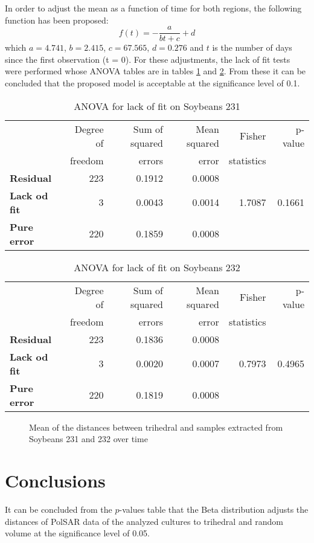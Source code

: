 \documentclass[12pt]{article}
\begin{document}
In order to adjust the mean as a function of time for both regions, the following function has been proposed:
\begin{equation}
f(t) = -\frac{a}{bt + c} + d
\end{equation}
which $a = 4.741$, $b = 2.415$, $c = 67.565$, $d = 0.276$ and $t$ is the number of days since the first observation (t = 0). For these adjustments, the lack of fit tests were performed whose ANOVA tables are in tables \ref{tab:anova_sb231} and \ref{tab:anova_sb232}. From these it can be concluded that the proposed model is acceptable at the significance level of 0.1.

\begin{table}[hbt]
  \centering
  \caption{ANOVA for lack of fit on Soybeans 231}
  \label{tab:anova_sb231}
  \begin{tabular}{lrrrrr}
    \toprule
    & Degree of & Sum of squared & Mean squared & Fisher & p-value\\
    & freedom & errors & error & statistics &\\
    \cmidrule(lr){2-6}
    \textbf{Residual} & 223 & 0.1912 & 0.0008 & &\\
    \textbf{Lack od fit} & 3 & 0.0043 & 0.0014 & 1.7087 & 0.1661\\
    \textbf{Pure error} & 220 & 0.1859 & 0.0008 & &\\
    \bottomrule
  \end{tabular}
\end{table}

\begin{table}[hbt]
  \centering
  \caption{ANOVA for lack of fit on Soybeans 232}
  \label{tab:anova_sb232}
  \begin{tabular}{lrrrrr}
    \toprule
    & Degree of & Sum of squared & Mean squared & Fisher & p-value\\
    & freedom & errors & error & statistics &\\
    \cmidrule(lr){2-6}
    \textbf{Residual} & 223 & 0.1836 & 0.0008 & &\\
    \textbf{Lack od fit} & 3 & 0.0020 & 0.0007 & 0.7973 & 0.4965\\
    \textbf{Pure error} & 220 & 0.1819 & 0.0008 & &\\
    \bottomrule
  \end{tabular}
\end{table}

\begin{figure*}[!h]
  \caption{Mean of the distances between trihedral and samples extracted from Soybeans 231 and 232 over time}
  \label{fig:tri_mean_sb_231_232}
\end{figure*}
\section{Conclusions}
It can be concluded from the $p$-values table that the Beta distribution adjusts the distances of PolSAR data of the analyzed cultures to trihedral and random volume at the significance level of 0.05.
\end{document}
